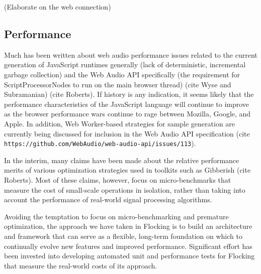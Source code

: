 \documentclass{article}
\begin{document}
(Elaborate on the web connection)

\subsection{Performance}

Much has been written about web audio performance issues related to the current generation of JavaScript runtimes generally (lack of deterministic, incremental garbage collection) and the Web Audio API specifically (the requirement for ScriptProcessorNodes to run on the main browser thread) (cite Wyse and Subramanian) (cite Roberts). If history is any indication, it seems likely that the performance characteristics of the JavaScript language will continue to improve as the browser performance wars continue to rage between Mozilla, Google, and Apple. In addition, Web Worker-based strategies for sample generation are currently being discussed for inclusion in the Web Audio API specification (cite \verb|https://github.com/WebAudio/web-audio-api/issues/113|).

In the interim, many claims have been made about the relative performance merits of various optimization strategies used in toolkits such as Gibberish (cite Roberts). Most of these claims, however, focus on micro-benchmarks that measure the cost of small-scale operations in isolation, rather than taking into account the performance of real-world signal processing algorithms.

Avoiding the temptation to focus on micro-benchmarking and premature optimization, the approach we have taken in Flocking is to build an architecture and framework that can serve as a flexible, long-term foundation on which to continually evolve new features and improved performance. Significant effort has been invested into developing automated unit and performance tests for Flocking that measure the real-world costs of its approach.
\end{document}
